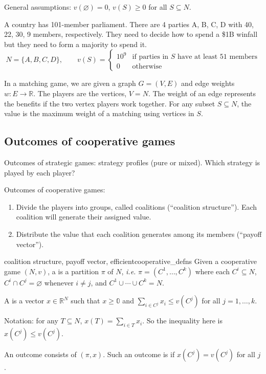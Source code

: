 \documentclass[12pt,letterpaper]{report}
\begin{document}
General assumptions: $v(\varnothing) = 0$, $v(S) \geq 0$ for all $S \subseteq N$.

\begin{ex}
  A country has 101-member parliament.
  There are 4 parties A, B, C, D with 40, 22, 30, 9 members, respectively.
  They need to decide how to spend a \$1B winfall but they need to form a majority to spend it.
  \[
    N = \{A, B, C, D\}, \qquad v(S) = \begin{cases}
      10^9 & \text{if parties in } S \text{ have at least 51 members} \\
      0 & \text{otherwise}
    \end{cases}
  \]
\end{ex}

\begin{ex}
  In a matching game, we are given a graph $G = (V, E)$ and edge weights
  $w \colon E \to \mathbb{R}$.
  The players are the vertices, $V = N$.
  The weight of an edge represents the benefits if the two vertex players work together.
  For any subset $S \subseteq N$, the value is the maximum weight of a matching using vertices in
  $S$.
\end{ex}

\subsection{Outcomes of cooperative games}

Outcomes of strategic games: strategy profiles (pure or mixed).
Which strategy is played by each player?

Outcomes of cooperative games:
\begin{enumerate}
  \item
  Divide the players into groups, called coalitions (``coalition structure'').
  Each coalition will generate their assigned value.
  \item
  Distribute the value that each coalition generates among its members (``payoff vector'').
\end{enumerate}

\begin{defn}{coalition structure, payoff vector, efficient}{cooperative_defns}
  Given a cooperative game $(N, v)$, a  is a partition $\pi$ of $N$,
  \emph{i.e.} $\pi = (C^1, \ldots, C^k)$ where each $C^i \subseteq N$, $C^i \cap C^j = \varnothing$
  whenever $i \neq j$, and $C^1 \cup \cdots \cup C^k = N$.

  A  is a vector $x \in \mathbb{R}^N$ such that $x \geq \mathbb{0}$ and
  $\sum\limits_{i \in C^j} x_i \leq v(C^j)$ for all $j = 1, \ldots, k$.

  Notation: for any $T \subseteq N$, $x(T) = \sum\limits_{i \in T} x_i$.
  So the inequality here is $x(C^j) \leq v(C^j)$.

  An outcome consists of $(\pi, x)$.
  Such an outcome is  if $x(C^j) = v(C^j)$ for all $j$.
\end{defn}
\end{document}
